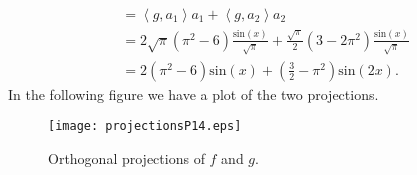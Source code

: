 \begin{questions}
\begin{solution}
\begin{align*}
&=\left<g,a_1\right>a_1+\left<g,a_2\right>a_2\\
&=2\sqrt{\pi}\left(\pi^2-6\right)\frac{\text{sin}(x)}{\sqrt{\pi}}+\frac{\sqrt{\pi}}{2}\left(3-2\pi^2\right)\frac{\text{sin}(x)}{\sqrt{\pi}}\\
&=2\left(\pi^2-6\right)\text{sin}(x)+\left(\frac{3}{2}-\pi^2\right)\text{sin}(2x).
\end{align*}
In the following figure we have a plot of the two projections.
\begin{figure}[H]
\centering     %
{\texttt{[image: projectionsP14.eps]}}
\caption{Orthogonal projections of $f$ and $g$.}
\end{figure}
\end{solution}
\end{questions}
